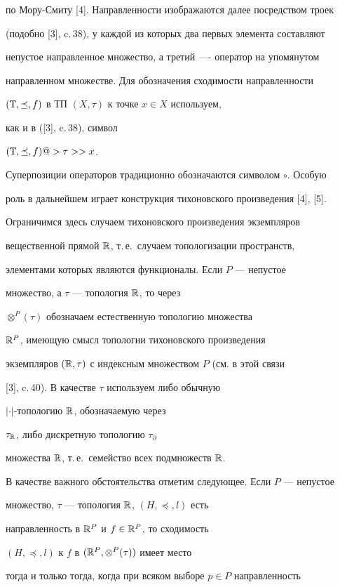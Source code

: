 по Мору-Смиту [4]. Направленности изображаются далее посредством троек


(подобно [3], c.\,38), у каждой из которых два первых элемента составляют


непустое направленное множество, а третий ---- оператор на упомянутом


направленном множестве. Для обозначения сходимости направленности


$(\Bbb T,\preceq,f)$ в ТП $(X,\tau)$ к точке $x\in X$ используем,


как и в ([3], c.\,38), символ


$(\Bbb T,\preceq,f)@>\tau>>x$.


Суперпозиции операторов традиционно обозначаются символом $\circ$. Особую


роль в дальнейшем играет конструкция тихоновского произведения [4], [5].


Ограничимся здесь случаем тихоновского произведения экземпляров


вещественной прямой $\Bbb R$, т.\,е.~случаем топологизации пространств,


элементами которых являются функционалы. Если $P$ --- непустое


множество, а $\tau$ --- топология $\Bbb R$, то через


$\otimes^P(\tau)$ обозначаем естественную топологию множества


$\Bbb R^P$, имеющую смысл топологии тихоновского произведения


экземпляров $(\Bbb R,\tau)$ с индексным множеством $P$ (см. в этой связи


[3], c.\,40). В качестве $\tau$ используем либо обычную


$|\cdot|$-топологию $\Bbb R$, обозначаемую через


$\tau_{\Bbb R}$, либо дискретную топологию $\tau_\partial$


множества $\Bbb R$, т.\,е.~семейство всех подмножеств $\Bbb R$.


В качестве важного обстоятельства отметим следующее. Если $P$ --- непустое


множество, $\tau$ --- топология $\Bbb R$, $(H,\preceq,l)$ есть


направленность в $\Bbb R^P$ и $f\in\Bbb R^P$, то сходимость


$(H,\preceq,l)$ к $f$ в $(\Bbb R^P,\otimes^P(\tau))$ имеет место


тогда и только тогда, когда при всяком выборе $p\in P$ направленность


